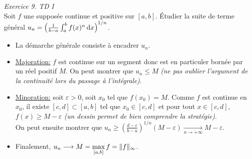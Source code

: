  \begin{exercice}
    \emph{Exercice 9. TD I}\\
    Soit $f$ une supposée continue et positive sur $[a, b]$. Étudier la suite de terme général $u_n = \left( \frac{1}{b-a} \int_{a}^{b} f(x)^n \, \mathrm{d} x \right)^{1/n}$.
 \end{exercice}

\begin{elem_sol}
    \begin{itemize}
        \item La démarche générale consiste à encadrer $u_n$. 
        \item \underline{Majoration:} $f$ est continue sur un segment donc est en particuler bornée par un réel positif $M$. On peut montrer que $u_n \leqslant M$ \emph{(ne pas oublier l'argument de la continuité lors du passage à l'intégrale)}.
        \item \underline{Minoration:} soit $\varepsilon > 0$, soit $x_0$ tel que $f(x_0) = M$. Comme $f$ est continue en $x_0$, il existe $[c, d] \subset [a, b]$ tel que $x_0 \in [c, d]$ et pour tout $x \in [c, d]$, $f(x) \geqslant M - \varepsilon$ \emph{(un dessin permet de bien comprendre la stratégie)}.\\
        On peut ensuite montrer que $u_n \geqslant \left(\frac{d-c}{b-a} \right)^{1/n}(M-\varepsilon) \xrightarrow[n \to + \infty]{} M-\varepsilon$.
        \item Finalement, $u_n \displaystyle \longrightarrow M = \max_{[ a, b ]} f = \Vert f \Vert_\infty$.
    \end{itemize}
\end{elem_sol}
